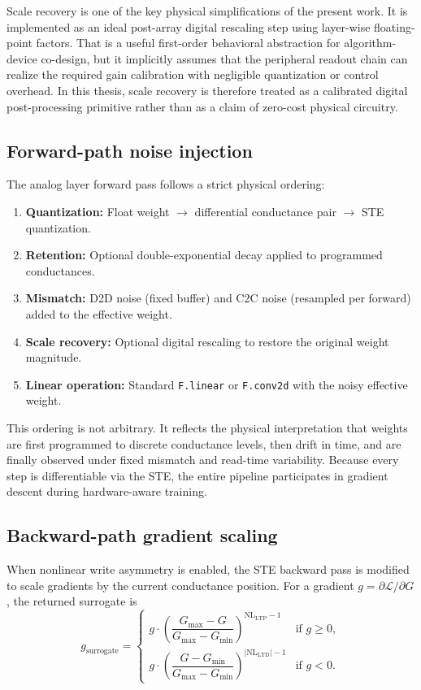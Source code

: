Scale recovery is one of the key physical simplifications of the present work. It is implemented as an ideal post-array digital rescaling step using layer-wise floating-point factors. That is a useful first-order behavioral abstraction for algorithm-device co-design, but it implicitly assumes that the peripheral readout chain can realize the required gain calibration with negligible quantization or control overhead. In this thesis, scale recovery is therefore treated as a calibrated digital post-processing primitive rather than as a claim of zero-cost physical circuitry.

\subsection{Forward-path noise injection}

The analog layer forward pass follows a strict physical ordering:
\begin{enumerate}
\item \textbf{Quantization:} Float weight $\rightarrow$ differential conductance pair $\rightarrow$ STE quantization.
\item \textbf{Retention:} Optional double-exponential decay applied to programmed conductances.
\item \textbf{Mismatch:} D2D noise (fixed buffer) and C2C noise (resampled per forward) added to the effective weight.
\item \textbf{Scale recovery:} Optional digital rescaling to restore the original weight magnitude.
\item \textbf{Linear operation:} Standard \texttt{F.linear} or \texttt{F.conv2d} with the noisy effective weight.
\end{enumerate}

This ordering is not arbitrary. It reflects the physical interpretation that weights are first programmed to discrete conductance levels, then drift in time, and are finally observed under fixed mismatch and read-time variability. Because every step is differentiable via the STE, the entire pipeline participates in gradient descent during hardware-aware training.

\subsection{Backward-path gradient scaling}

When nonlinear write asymmetry is enabled, the STE backward pass is modified to scale gradients by the current conductance position. For a gradient $g = \partial \mathcal{L} / \partial G$, the returned surrogate is
\begin{equation}
g_{\text{surrogate}} = \begin{cases}
g \cdot \left(\dfrac{G_{\max} - G}{G_{\max} - G_{\min}}\right)^{\mathrm{NL}_{\mathrm{LTP}} - 1} & \text{if } g \ge 0, \\[1.2em]
g \cdot \left(\dfrac{G - G_{\min}}{G_{\max} - G_{\min}}\right)^{|\mathrm{NL}_{\mathrm{LTD}}| - 1} & \text{if } g < 0.
\end{cases}
\label{eq:nl-gradient-scaling}
\end{equation}

